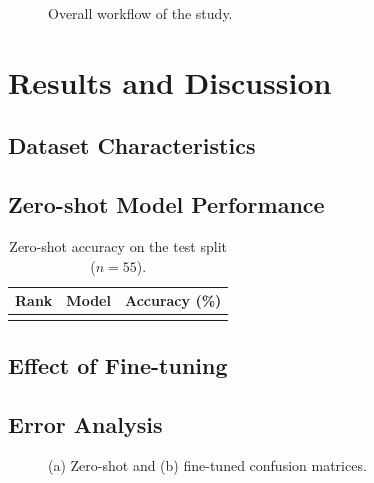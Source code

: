 \documentclass[12pt]{article}
\begin{document}
\begin{figure}[H]
  \centering
  \caption{Overall workflow of the study.}
  \label{fig:workflow}
\end{figure}

\section{Results and Discussion}

\subsection{Dataset Characteristics}

\subsection{Zero-shot Model Performance}
\begin{table}[H]
  \centering
  \caption{Zero-shot accuracy on the test split ($n=55$).}
  \label{tab:zeroshot}
  \begin{tabular}{clc}
    \toprule
    Rank & Model & Accuracy (\%) \\
    \midrule
     &  &  \\
    \bottomrule
  \end{tabular}
\end{table}

\subsection{Effect of Fine-tuning}

\subsection{Error Analysis}
\begin{figure}[H]
  \centering
  \begin{subfigure}{0.48\textwidth}
    \caption{}
  \end{subfigure}
  \hfill
  \begin{subfigure}{0.48\textwidth}
    \caption{}
  \end{subfigure}
  \caption{(a) Zero-shot and (b) fine-tuned confusion matrices.}
  \label{fig:confusion}
\end{figure}
\end{document}
